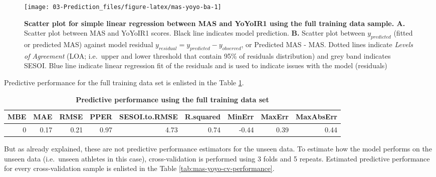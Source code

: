 \documentclass[
]{book}
\begin{document}
\begin{figure}

{\centering \texttt{[image: 03-Prediction\_files/figure-latex/mas-yoyo-ba-1]} 

}

\caption{\textbf{Scatter plot for simple linear regression between MAS and YoYoIR1 using the full training data sample. A. } Scatter plot between MAS and YoYoIR1 scores. Black line indicates model prediction. \textbf{B.} Scatter plot between \(y_{predicted}\) (fitted or predicted MAS) against model residual \(y_{residual} = y_{predicted} - y_{observed}\), or Predicted MAS - MAS. Dotted lines indicate \emph{Levels of Agreement} (LOA; i.e.~upper and lower threshold that contain 95\% of residuals distribution) and grey band indicates SESOI. Blue line indicate linear regression fit of the residuals and is used to indicate issues with the model (residuals)}\label{fig:mas-yoyo-ba}
\end{figure}



Predictive performance for the full training data set is enlisted in the Table \ref{tab:mas-yoyo-training-performance}.



\begin{table}

\caption{\label{tab:mas-yoyo-training-performance}\textbf{Predictive performance using the full training data set}}
\centering
\begin{tabular}[t]{rrrrrrrrr}
\toprule
MBE & MAE & RMSE & PPER & SESOI.to.RMSE & R.squared & MinErr & MaxErr & MaxAbsErr\\
\midrule
0 & 0.17 & 0.21 & 0.97 & 4.73 & 0.74 & -0.44 & 0.39 & 0.44\\
\bottomrule
\end{tabular}
\end{table}

But as already explained, these are not predictive performance estimators for the unseen data. To estimate how the model performs on the unseen data (i.e.~unseen athletes in this case), cross-validation is performed using 3 folds and 5 repeats. Estimated predictive performance for every cross-validation sample is enlisted in the Table \ref{tab:mas-yoyo-cv-performance}.
\end{document}
